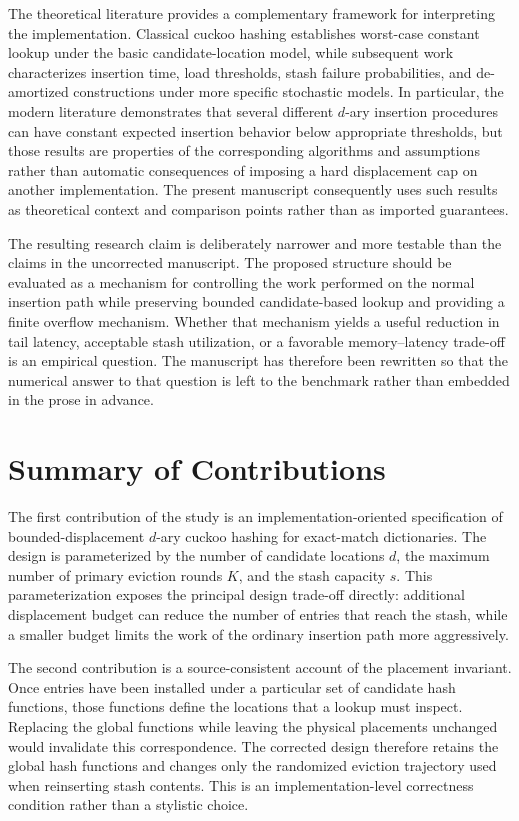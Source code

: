 \documentclass[conference]{IEEEtran}
\begin{document}
The theoretical literature provides a complementary framework for interpreting the implementation. Classical cuckoo hashing establishes worst-case constant lookup under the basic candidate-location model, while subsequent work characterizes insertion time, load thresholds, stash failure probabilities, and de-amortized constructions under more specific stochastic models. In particular, the modern literature demonstrates that several different $d$-ary insertion procedures can have constant expected insertion behavior below appropriate thresholds, but those results are properties of the corresponding algorithms and assumptions rather than automatic consequences of imposing a hard displacement cap on another implementation. The present manuscript consequently uses such results as theoretical context and comparison points rather than as imported guarantees.

The resulting research claim is deliberately narrower and more testable than the claims in the uncorrected manuscript. The proposed structure should be evaluated as a mechanism for controlling the work performed on the normal insertion path while preserving bounded candidate-based lookup and providing a finite overflow mechanism. Whether that mechanism yields a useful reduction in tail latency, acceptable stash utilization, or a favorable memory--latency trade-off is an empirical question. The manuscript has therefore been rewritten so that the numerical answer to that question is left to the benchmark rather than embedded in the prose in advance.

\section{Summary of Contributions}
\label{sec:contribution_summary}

The first contribution of the study is an implementation-oriented specification of bounded-displacement $d$-ary cuckoo hashing for exact-match dictionaries. The design is parameterized by the number of candidate locations $d$, the maximum number of primary eviction rounds $K$, and the stash capacity $s$. This parameterization exposes the principal design trade-off directly: additional displacement budget can reduce the number of entries that reach the stash, while a smaller budget limits the work of the ordinary insertion path more aggressively.

The second contribution is a source-consistent account of the placement invariant. Once entries have been installed under a particular set of candidate hash functions, those functions define the locations that a lookup must inspect. Replacing the global functions while leaving the physical placements unchanged would invalidate this correspondence. The corrected design therefore retains the global hash functions and changes only the randomized eviction trajectory used when reinserting stash contents. This is an implementation-level correctness condition rather than a stylistic choice.
\end{document}
